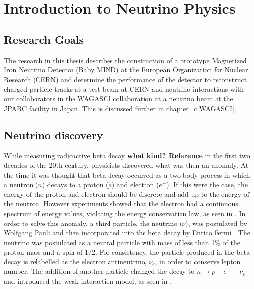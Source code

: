 \chapter{Introduction to Neutrino Physics}
\label{c:theoryIntro}

\section{Research Goals}
The research in this thesis describes the construction of a prototype Magnetized Iron Neutrino Detector (Baby MIND) at the European Organization for Nuclear Research (CERN) and determine the performance of the detector to reconstruct charged particle tracks at a test beam at CERN and neutrino interactions with our collaborators in the WAGASCI collaboration at a neutrino beam at the JPARC facility in Japan. This is discussed further in chapter~\ref{c:WAGASCI}.


\section{Neutrino discovery}\label{section:Theory}
While measuring radioactive beta decay \textbf{what kind? Reference} in the first two decades of the 20th century, physicists discovered what was then an anomaly. At the time it was thought that beta decay occurred as a two body process in which a neutron ($n$) decays to a proton ($p$) and electron ($e^-$). If this were the case, the energy of the proton and electron should be discrete and add up to the energy of the neutron. However experiments showed that the electron had a continuous spectrum of energy values, violating the energy conservation law, as seen in . In order to solve this anomaly, a third particle, the neutrino ($\nu$), was postulated by Wolfgang Pauli \cite{4Pauli:Online} and then incorporated into the beta decay by Enrico Fermi \cite{5Wilson}. The neutrino was postulated as a neutral particle with mass of less than 1\% of the proton mass and a spin of 1/2. For consistency, the particle produced in the beta decay is relabelled as the electron antineutrino, $\bar{\nu_e}$, in order to conserve lepton number. The addition of another particle changed the decay to $n \rightarrow p + e^- + \bar{\nu_e}$ and introduced the weak interaction model, as seen in . 

